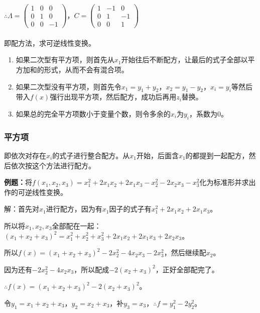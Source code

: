 $\therefore\Lambda=\left(\begin{array}{ccc}
    1 & 0 & 0 \\
    0 & 1 & 0 \\
    0 & 0 & -1
\end{array}\right)$，$C=\left(\begin{array}{ccc}
    1 & -1 & 0 \\
    0 & 1 & -1 \\
    0 & 0 & 1
\end{array}\right)$

\paragraph{}

即配方法，求可逆线性变换。

\begin{enumerate}
    \item 如果二次型有平方项，则首先从$x_1$开始往后不断配方，让最后的式子全部以平方加和的形式，从而不会有混合项。
    \item 如果二次型没有平方项，则首先令$x_1=y_1+y_2$，$x_2=y_1-y_2$，$x_i=y_i$等然后带入$f(x)$强行出现平方项，然后配方，成功后再用$z_i$替换。
    \item 如果总的完全平方项数小于变量个数，则令多余的$x_i$为$y_i$，系数为0。
\end{enumerate}

\subsubsection{平方项}

即依次对存在$x_i$的式子进行整合配方。从$x_1$开始，后面含$x_1$的都提到一起配方，然后依次按这个方法进行配方。

\textbf{例题：}将$f(x_1,x_2,x_3)=x_1^2+2x_1x_2+2x_1x_3-x_2^2-2x_2x_3-x_3^2$化为标准形并求出作的可逆线性变换。

解：首先对$x_1$进行配方，因为有$x_1$因子的式子有$x_1^2+2x_1x_2+2x_1x_3$。

所以将$x_1,x_2,x_3$全部配在一起：$(x_1+x_2+x_3)^2=x_1^2+x_2^2+x_3^2+2x_1x_2+2x_1x_3+2x_2x_3$。

所以$f(x)=(x_1+x_2+x_3)^2-2x_2^2-4x_2x_3-2x_3^2$，然后继续配$x_2$。

因为还有$-2x_2^2-4x_2x_3$，所以配成$-2(x_2+x_3)^2$，正好全部配完了。

$\therefore f(x)=(x_1+x_2+x_3)^2-2(x_2+x_3)^2$。

令$y_1=x_1+x_2+x_3$，$y_2=x_2+x_3$，补$y_3=x_3$，$\therefore f=y_1^2-2y_2^2$。

